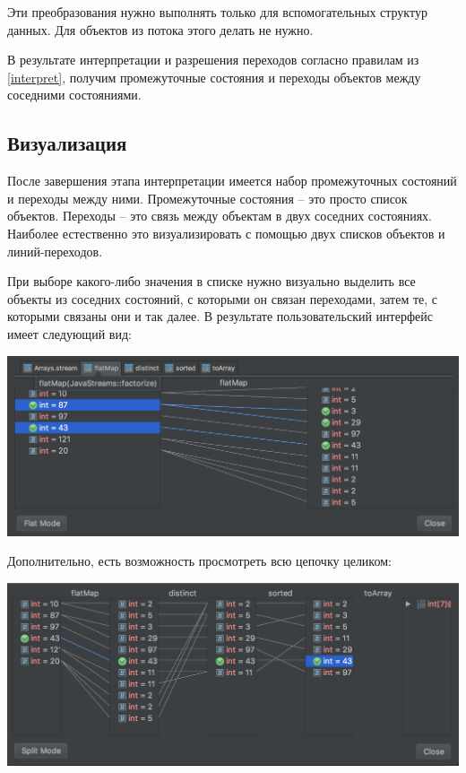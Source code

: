 Эти преобразования нужно выполнять только для вспомогательных структур данных. Для объектов из потока этого делать не нужно.

В результате интерпретации и разрешения переходов согласно правилам из \ref{interpret}, получим промежуточные состояния и переходы объектов между соседними состояниями.

\subsection{Визуализация}
После завершения этапа интерпретации имеется набор промежуточных состояний и переходы между ними. Промежуточные состояния -- это просто список объектов. Переходы -- это связь между объектам в двух соседних состояниях. Наиболее естественно это визуализировать с помощью двух списков объектов и линий-переходов.

При выборе какого-либо значения в списке нужно визуально выделить все объекты из соседних состояний, с которыми он связан переходами, затем те, с которыми связаны они и так далее. 
\newpage
В результате пользовательский интерфейс имеет следующий вид:

\includegraphics[scale=0.3]{chapter3/img/split-view.png}

Дополнительно, есть возможность просмотреть всю цепочку целиком:

\includegraphics[scale=0.4]{chapter3/img/flat-view.png}











